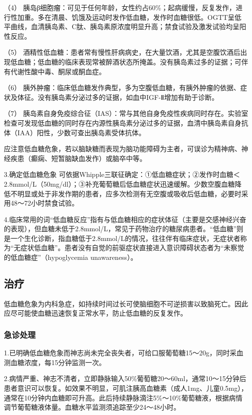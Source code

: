 （4）
胰岛β细胞瘤：可见于任何年龄，女性约占60\%；起病缓慢，反复发作，进行性加重。多在清晨、饥饿及运动时发作低血糖，发作时血糖很低。OGTT呈低平曲线，血清胰岛素、C肽、胰岛素原浓度明显升高；禁食试验及激发试验均呈阳性反应。

（5）
酒精性低血糖：患者常有慢性肝病病史，在大量饮酒，尤其是空腹饮酒后出现低血糖；低血糖的临床表现常被醉酒状态所掩盖。没有胰岛素过多的证据；可伴有代谢性酸中毒、酮尿或酮血症。

（6）
胰外肿瘤：临床低血糖发作典型，多为空腹低血糖，有胰外肿瘤的依据、症状及体征。没有胰岛素分泌过多的证据，如血中IGF-Ⅱ增加有助于诊断。

（7）
胰岛素自身免疫综合征（IAS）：常与其他自身免疫性疾病同时存在。实验室检查可发现低血糖的同时存在内源性胰岛素分泌过多的证据，血清中胰岛素自身抗体（IAA）阳性，少数可查出胰岛素受体抗体。

应注意低血糖危象，若以脑缺糖而表现为脑功能障碍为主者，可误诊为精神病、神经疾患（癫痫、短暂脑缺血发作）或脑卒中等。

3.确定低血糖危象 可依据Whipple三联征确定：①低血糖症状；②发作时血糖＜
2.8mmol/L（50mg/dl）；③补充葡萄糖后低血糖症状迅速缓解。少数空腹血糖降低不明显或处于非发作期的患者，应多次检测有无空腹或吸收后低血糖，必要时采用48～72小时禁食试验。

4.临床常用的词“低血糖反应”指有与低血糖相应的症状体征（主要是交感神经兴奋的表现），但血糖未低于2.8mmol/L，常见于药物治疗的糖尿病患者。“低血糖”则是一个生化诊断，指血糖低于2.8mmol/L的情况，往往伴有临床症状，无症状者称为“无症状低血糖”。患者没有自觉的前驱症状直接进入意识障碍状态者为“未察觉的低血糖症”（hypoglycemia
unawareness）。

\subsection{治疗}

低血糖危象为内科急症，如持续时间过长可使脑细胞不可逆损害以致脑死亡。因此应尽可能使血糖迅速恢复正常水平，防止低血糖的反复发作。

\subsubsection{急诊处理}

1.已明确低血糖危象而神志尚未完全丧失者，可给口服葡萄糖15～20g，同时采血测血糖浓度，每15分钟监测一次。

2.病情严重、神志不清者，立即静脉输入50\%葡萄糖20～60ml，通常10～15分钟后患者意识可以恢复。如效果不明显，可肌注胰高血糖素（成人1mg、儿童0.5mg），通常在10分钟内血糖即可升高。此后持续静脉滴注5\%～10\%葡萄糖液，根据病情调节葡萄糖液体量。血糖水平监测须追踪至少24～48小时。

